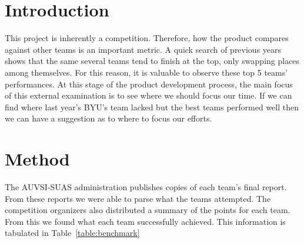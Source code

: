 \documentclass[]{auvsi_doc}
\begin{document}
\CapstoneTitlePage

\section{Introduction}

This project is inherently a competition. Therefore, how the product compares against other teams is an important metric.  A quick search of previous years shows that the same several teams tend to finish at the top, only swapping places among themselves. For this reason, it is valuable to observe these top 5 teams' performances. At this stage of the product development process, the main focus of this external examination is to see where we should focus our time. If we can find where last year's BYU's team lacked but the best teams performed well then we can have a suggestion as to where to focus our efforts.

\section{Method}
The AUVSI-SUAS administration publishes copies of each team's final report. From these reports we were able to parse what the teams attempted. The competition organizers also distributed a summary of the points for each team. From this we found what each team successfully achieved. This information is tabulated in Table~\ref{table:benchmark}
\end{document}
